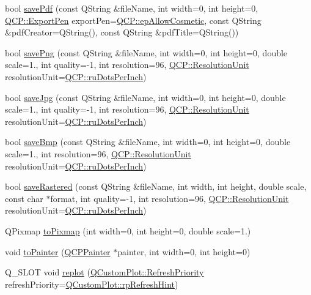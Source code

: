 \begin{DoxyCompactItemize}
bool \hyperlink{class_q_custom_plot_ad5acd34f6b39c3516887d7e54fec2412}{save\+Pdf} (const Q\+String \&file\+Name, int width=0, int height=0, \hyperlink{namespace_q_c_p_a17844f19e1019693a953e1eb93536d2f}{Q\+C\+P\+::\+Export\+Pen} export\+Pen=\hyperlink{namespace_q_c_p_a17844f19e1019693a953e1eb93536d2fa50d3657dba3fb90560b93a823cb0a6e8}{Q\+C\+P\+::ep\+Allow\+Cosmetic}, const Q\+String \&pdf\+Creator=Q\+String(), const Q\+String \&pdf\+Title=Q\+String())
\item 
bool \hyperlink{class_q_custom_plot_ac92cc9256d12f354b40a4be4600b5fb9}{save\+Png} (const Q\+String \&file\+Name, int width=0, int height=0, double scale=1., int quality=-\/1, int resolution=96, \hyperlink{namespace_q_c_p_a715d46153da230990aa887d0f0602452}{Q\+C\+P\+::\+Resolution\+Unit} resolution\+Unit=\hyperlink{namespace_q_c_p_a715d46153da230990aa887d0f0602452affb887d8efe79c39a1aca2acd7002afc}{Q\+C\+P\+::ru\+Dots\+Per\+Inch})
\item 
bool \hyperlink{class_q_custom_plot_a76f0d278e630a711fa6f48048cfd83e4}{save\+Jpg} (const Q\+String \&file\+Name, int width=0, int height=0, double scale=1., int quality=-\/1, int resolution=96, \hyperlink{namespace_q_c_p_a715d46153da230990aa887d0f0602452}{Q\+C\+P\+::\+Resolution\+Unit} resolution\+Unit=\hyperlink{namespace_q_c_p_a715d46153da230990aa887d0f0602452affb887d8efe79c39a1aca2acd7002afc}{Q\+C\+P\+::ru\+Dots\+Per\+Inch})
\item 
bool \hyperlink{class_q_custom_plot_ae3a86ed0795670e50afa21759d4fa13d}{save\+Bmp} (const Q\+String \&file\+Name, int width=0, int height=0, double scale=1., int resolution=96, \hyperlink{namespace_q_c_p_a715d46153da230990aa887d0f0602452}{Q\+C\+P\+::\+Resolution\+Unit} resolution\+Unit=\hyperlink{namespace_q_c_p_a715d46153da230990aa887d0f0602452affb887d8efe79c39a1aca2acd7002afc}{Q\+C\+P\+::ru\+Dots\+Per\+Inch})
\item 
bool \hyperlink{class_q_custom_plot_ad7723ce2edfa270632ef42b03a444352}{save\+Rastered} (const Q\+String \&file\+Name, int width, int height, double scale, const char $\ast$format, int quality=-\/1, int resolution=96, \hyperlink{namespace_q_c_p_a715d46153da230990aa887d0f0602452}{Q\+C\+P\+::\+Resolution\+Unit} resolution\+Unit=\hyperlink{namespace_q_c_p_a715d46153da230990aa887d0f0602452affb887d8efe79c39a1aca2acd7002afc}{Q\+C\+P\+::ru\+Dots\+Per\+Inch})
\item 
Q\+Pixmap \hyperlink{class_q_custom_plot_aabb974d71ce96c137dc04eb6eab844fe}{to\+Pixmap} (int width=0, int height=0, double scale=1.)
\item 
void \hyperlink{class_q_custom_plot_a1be68d5c0f1e086d6374d1340a193fb9}{to\+Painter} (\hyperlink{class_q_c_p_painter}{Q\+C\+P\+Painter} $\ast$painter, int width=0, int height=0)
\item 
Q\+\_\+\+S\+L\+OT void \hyperlink{class_q_custom_plot_aa4bfe7d70dbe67e81d877819b75ab9af}{replot} (\hyperlink{class_q_custom_plot_a45d61392d13042e712a956d27762aa39}{Q\+Custom\+Plot\+::\+Refresh\+Priority} refresh\+Priority=\hyperlink{class_q_custom_plot_a45d61392d13042e712a956d27762aa39a49666a5854a68dbcca8b277b03331260}{Q\+Custom\+Plot\+::rp\+Refresh\+Hint})
\end{DoxyCompactItemize}
